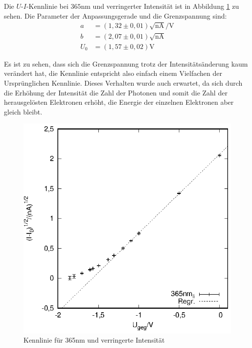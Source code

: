 Die $U$-$I$-Kennlinie bei $365$nm und verringerter Intensität ist in Abbildung \ref{fig:lowintensity} zu sehen. Die Parameter der Anpassungsgerade und die Grenzspannung sind:
\begin{align*}
  a&=(1,32 \pm 0,01)\sqrt{\mathrm{nA}}/\mathrm{V}\\
  b&=(2,07 \pm 0,01)\sqrt{\mathrm{nA}}\\
  U_0&=(1,57 \pm 0,02)\mathrm{V}   
\end{align*}

Es ist zu sehen, dass sich die Grenzspannung trotz der Intensitätsänderung kaum verändert hat, die Kennlinie entspricht also einfach einem Vielfachen der Ursprünglichen Kennlinie. Dieses Verhalten wurde auch erwartet, da sich durch die Erhöhung der Intensität die Zahl der Photonen und somit die Zahl der herausgelösten Elektronen erhöht, die Energie der einzelnen Elektronen aber gleich bleibt.

\begin{figure}[h]
  \centering
  \includegraphics[width=0.75\linewidth]{data/Messung_photoeffekt/365nm_low_intensity.eps}
  \caption{Kennlinie für 365nm und verringerte Intensität}
  \label{fig:lowintensity}
\end{figure}
